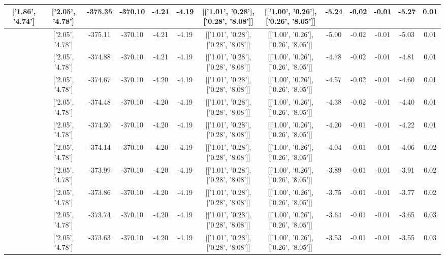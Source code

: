 \begin{table}[htbp]
\begin{adjustbox}{angle=90}
\begin{tabular}{|c|c|c|c|c|c|c|c|c|c|c|c|c|}
 ['1.86', '4.74'] & ['2.05', '4.78'] & -375.35 & -370.10 & -4.21 & -4.19 & [['1.01', '0.28'], ['0.28', '8.08']] & [['1.00', '0.26'], ['0.26', '8.05']] & -5.24 & -0.02 & -0.01 & -5.27 & 0.01\\ \hline
 ['1.87', '4.75'] & ['2.05', '4.78'] & -375.11 & -370.10 & -4.21 & -4.19 & [['1.01', '0.28'], ['0.28', '8.08']] & [['1.00', '0.26'], ['0.26', '8.05']] & -5.00 & -0.02 & -0.01 & -5.03 & 0.01\\ \hline
 ['1.89', '4.75'] & ['2.05', '4.78'] & -374.88 & -370.10 & -4.21 & -4.19 & [['1.01', '0.28'], ['0.28', '8.08']] & [['1.00', '0.26'], ['0.26', '8.05']] & -4.78 & -0.02 & -0.01 & -4.81 & 0.01\\ \hline
 ['1.90', '4.75'] & ['2.05', '4.78'] & -374.67 & -370.10 & -4.20 & -4.19 & [['1.01', '0.28'], ['0.28', '8.08']] & [['1.00', '0.26'], ['0.26', '8.05']] & -4.57 & -0.02 & -0.01 & -4.60 & 0.01\\ \hline
 ['1.91', '4.75'] & ['2.05', '4.78'] & -374.48 & -370.10 & -4.20 & -4.19 & [['1.01', '0.28'], ['0.28', '8.08']] & [['1.00', '0.26'], ['0.26', '8.05']] & -4.38 & -0.02 & -0.01 & -4.40 & 0.01\\ \hline
 ['1.92', '4.76'] & ['2.05', '4.78'] & -374.30 & -370.10 & -4.20 & -4.19 & [['1.01', '0.28'], ['0.28', '8.08']] & [['1.00', '0.26'], ['0.26', '8.05']] & -4.20 & -0.01 & -0.01 & -4.22 & 0.01\\ \hline
 ['1.93', '4.76'] & ['2.05', '4.78'] & -374.14 & -370.10 & -4.20 & -4.19 & [['1.01', '0.28'], ['0.28', '8.08']] & [['1.00', '0.26'], ['0.26', '8.05']] & -4.04 & -0.01 & -0.01 & -4.06 & 0.02\\ \hline
 ['1.94', '4.76'] & ['2.05', '4.78'] & -373.99 & -370.10 & -4.20 & -4.19 & [['1.01', '0.28'], ['0.28', '8.08']] & [['1.00', '0.26'], ['0.26', '8.05']] & -3.89 & -0.01 & -0.01 & -3.91 & 0.02\\ \hline
 ['1.95', '4.76'] & ['2.05', '4.78'] & -373.86 & -370.10 & -4.20 & -4.19 & [['1.01', '0.28'], ['0.28', '8.08']] & [['1.00', '0.26'], ['0.26', '8.05']] & -3.75 & -0.01 & -0.01 & -3.77 & 0.02\\ \hline
 ['1.97', '4.77'] & ['2.05', '4.78'] & -373.74 & -370.10 & -4.20 & -4.19 & [['1.01', '0.28'], ['0.28', '8.08']] & [['1.00', '0.26'], ['0.26', '8.05']] & -3.64 & -0.01 & -0.01 & -3.65 & 0.03\\ \hline
 ['1.98', '4.77'] & ['2.05', '4.78'] & -373.63 & -370.10 & -4.20 & -4.19 & [['1.01', '0.28'], ['0.28', '8.08']] & [['1.00', '0.26'], ['0.26', '8.05']] & -3.53 & -0.01 & -0.01 & -3.55 & 0.03\\ \hline

\end{tabular}
\end{adjustbox}
\end{table}
